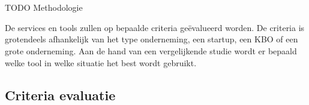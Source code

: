 
\chapter{}
\label{ch:methodologie}


TODO Methodologie



De services en tools zullen op bepaalde criteria geëvalueerd worden.
De criteria is grotendeels afhankelijk van het type onderneming, een startup, een KBO of een grote onderneming.
Aan de hand van een vergelijkende studie wordt er bepaald welke tool in welke situatie het best wordt gebruikt.


\section{Criteria evaluatie}
\label{sec:criteria-evaluatie}


